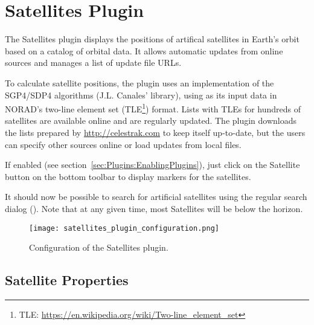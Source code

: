 \newpage
\section{Satellites Plugin}
\label{sec:plugins:Satellites}


\noindent The Satellites plugin displays the positions of artifical satellites in Earth's orbit based on a catalog of orbital data. It allows
automatic updates from online sources and manages a list of update
file URLs.

To calculate satellite positions, the plugin uses an implementation of
the SGP4/SDP4 algorithms (J.L. Canales'  library), using
as its input data in NORAD's two-line element set
(TLE\footnote{TLE: \url{https://en.wikipedia.org/wiki/Two-line_element_set}})
format. Lists with TLEs for hundreds of satellites are available
online and are regularly updated. The plugin downloads the lists
prepared by \url{http://celestrak.com} to keep itself up-to-date, but the users can
specify other sources online or load updates from local files.

If enabled (see
section~\ref{sec:Plugins:EnablingPlugins}), just click on the
Satellite button   on the bottom
toolbar to display markers for the satellites.

It should now be possible to search for artificial satellites using
the regular search dialog (). Note that at any given time, most
Satellites will be below the horizon.

\begin{figure}[htbp]
\centering\texttt{[image: satellites\_plugin\_configuration.png]}
\caption{Configuration of the Satellites plugin.}
\label{fig:plugins:Satellites:Configuration}
\end{figure}


\subsection{Satellite Properties}
\label{sec:plugins:Satellites:properties}

